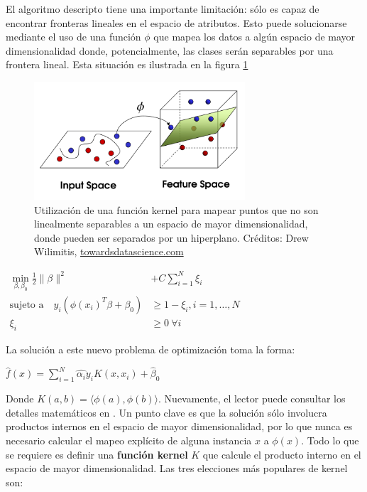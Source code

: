 El algoritmo descripto tiene una importante limitación: sólo es capaz de encontrar fronteras lineales en el espacio de atributos. Esto puede solucionarse mediante el uso de una función $\phi$ que mapea los datos a algún espacio de mayor dimensionalidad donde, potencialmente, las clases serán separables por una frontera lineal. Esta situación es ilustrada en la figura \ref{fig:svm_4}\\

\begin{figure}[h!]
\begin{center}
  \includegraphics[width=0.7\textwidth]{Kap1/svm5.png} 
  \end{center}
 \caption{ Utilización de una función kernel para mapear puntos que no son linealmente separables a un espacio de mayor dimensionalidad, donde pueden ser separados por un hiperplano. Créditos: Drew Wilimitis, \url{towardsdatascience.com} }
\label{fig:svm_4}
\end{figure}


\begin{center}
$\begin{aligned}
\min\limits_{\beta, \beta_0}   \frac{1}{2} \| \beta \|^2 &+ C \sum\limits_{i=1}^N \xi_i \\
\textrm{sujeto a} \quad  y_{i}(\phi(x_i)^T \beta + \beta_0)
  &\geq 1 - \xi_i, i=1,\ldots,N    \\
  \xi_i &\geq 0 \ \forall i 
\end{aligned}
$
\end{center}

La solución a este nuevo problema de optimización toma la forma:

\begin{center}
$\hat{f}(x) = \sum\limits_{i=1}^N \hat{\alpha_i} y_i K(x,x_i) + \hat{\beta}_0$ 
\end{center}

Donde $K(a,b) = \langle \phi(a),\phi(b) \rangle$. Nuevamente, el lector puede consultar los detalles matemáticos en \cite{statisticallearning}. Un punto clave es que la solución sólo involucra productos internos en el espacio de mayor dimensionalidad, por lo que nunca es necesario calcular el mapeo explícito de alguna instancia $x$ a $\phi(x)$. Todo lo que se requiere es definir una \textbf{función kernel} $K$ que calcule el producto interno en el espacio de mayor dimensionalidad. Las tres elecciones más populares de kernel son:

